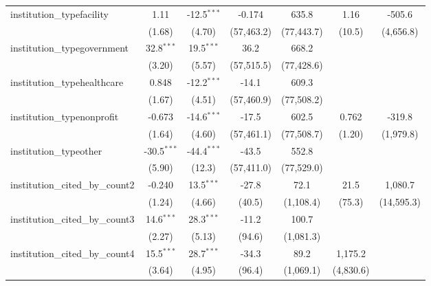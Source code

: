\begin{tabular}{lcccccc}
   institution\_typefacility             & 1.11          & -12.5$^{***}$ & -0.174       & 635.8      & 1.16      & -505.6\\   
                                         & (1.68)        & (4.70)        & (57,463.2)   & (77,443.7) & (10.5)    & (4,656.8)\\   
   institution\_typegovernment           & 32.8$^{***}$  & 19.5$^{***}$  & 36.2         & 668.2      &           &   \\   
                                         & (3.20)        & (5.57)        & (57,515.5)   & (77,428.6) &           &   \\   
   institution\_typehealthcare           & 0.848         & -12.2$^{***}$ & -14.1        & 609.3      &           &   \\   
                                         & (1.67)        & (4.51)        & (57,460.9)   & (77,508.2) &           &   \\   
   institution\_typenonprofit            & -0.673        & -14.6$^{***}$ & -17.5        & 602.5      & 0.762     & -319.8\\   
                                         & (1.64)        & (4.60)        & (57,461.1)   & (77,508.7) & (1.20)    & (1,979.8)\\   
   institution\_typeother                & -30.5$^{***}$ & -44.4$^{***}$ & -43.5        & 552.8      &           &   \\   
                                         & (5.90)        & (12.3)        & (57,411.0)   & (77,529.0) &           &   \\   
   institution\_cited\_by\_count2        & -0.240        & 13.5$^{***}$  & -27.8        & 72.1       & 21.5      & 1,080.7\\   
                                         & (1.24)        & (4.66)        & (40.5)       & (1,108.4)  & (75.3)    & (14,595.3)\\   
   institution\_cited\_by\_count3        & 14.6$^{***}$  & 28.3$^{***}$  & -11.2        & 100.7      &           &   \\   
                                         & (2.27)        & (5.13)        & (94.6)       & (1,081.3)  &           &   \\   
   institution\_cited\_by\_count4        & 15.5$^{***}$  & 28.7$^{***}$  & -34.3        & 89.2       & 1,175.2   &   \\   
                                         & (3.64)        & (4.95)        & (96.4)       & (1,069.1)  & (4,830.6) &   \\   

\end{tabular}
